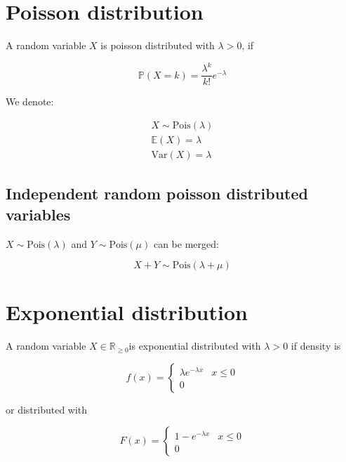\documentclass[twoside, a4paper, twocolumn]{article}
\begin{document}
    \section{Poisson distribution}

    A random variable $X$ is poisson distributed with $\lambda > 0$, if

    \begin{equation}
        \mathbb{P}(X = k) = \frac{\lambda^k}{k!}e^{-\lambda}
    \end{equation}

    We denote:

    \begin{eqnarray}
        X \sim \textrm{Pois}(\lambda) \\
        \mathbb{E}(X) = \lambda \\
        \textrm{Var}(X) = \lambda
    \end{eqnarray}

    \subsection{Independent random poisson distributed variables}

    $X \sim \textrm{Pois}(\lambda)$ and $Y \sim \textrm{Pois}(\mu)$ can be merged:

    \begin{equation}
        X + Y \sim \textrm{Pois}(\lambda + \mu)
    \end{equation}

    \section{Exponential distribution}

    A random variable $X \in \mathbb{R}_{\geq0}$is exponential distributed with
    $\lambda > 0$ if density is

    \begin{equation}
        f(x) = \begin{cases}
            \lambda e^{-\lambda x} & x \leq 0 \\
            0 
        \end{cases}
    \end{equation}

    or distributed with

    \begin{equation}
        F(x) = \begin{cases}
            1 -  e^{-\lambda x} & x \leq 0 \\
            0 
        \end{cases}
    \end{equation}
\end{document}
